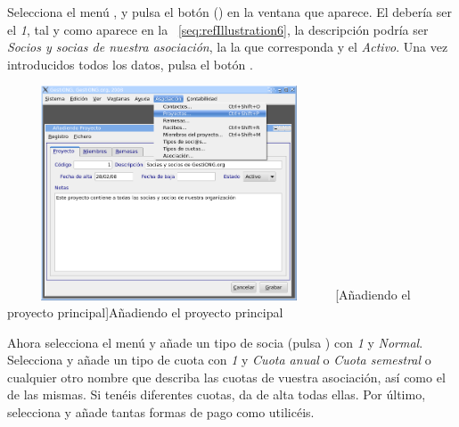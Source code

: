 Selecciona el menú , y pulsa el botón 
() en la ventana que aparece. El
 debería ser el
{\textquotesingle}\textit{1{\textquotesingle}}, tal y como aparece en
la \figurename~\ref{seq:refIllustration6}, la descripción podría
ser {\textquotesingle}\textit{Socios y socias de nuestra
asociación}{\textquotesingle}, la 
la que corresponda y el 
{\textquotesingle}\textit{Activo{\textquotesingle}}. Una vez
introducidos todos los datos, pulsa el botón
.

\begin{center}
\includegraphics[width=9.618cm,height=6.354cm]{manual-img11.png}
[Añadiendo el proyecto principal]{Añadiendo el
proyecto principal}
\label{seq:refIllustration6}

\end{center}
Ahora selecciona el menú \href{mailto:soci@s}{} y añade un tipo
de socia (pulsa ) con
{\textquotesingle}\textit{1}{\textquotesingle} y
{\textquotesingle}\textit{Normal}{\textquotesingle}. Selecciona
 y
añade un tipo de cuota con \textit{1}{\textquotesingle} y
 {\textquotesingle}\textit{Cuota
anual}{\textquotesingle} o {\textquotesingle}\textit{Cuota
semestral}{\textquotesingle} o cualquier otro nombre que describa las
cuotas de vuestra asociación, así como el
 de las mismas. Si tenéis diferentes
cuotas, da de alta todas ellas. Por último, selecciona
 y
añade tantas formas de pago como utilicéis.

